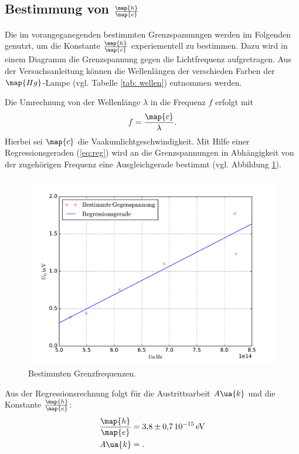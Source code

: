 \subsection{Bestimmung von $\frac{\map{h}}{\map{e}}$}

Die im vorangeganegenden bestimmten Grenzspanunngen werden im
Folgenden genutzt, um die Konstante $\frac{\map{h}}{\map{e}}$
experiementell zu bestimmen. Dazu wird in einem Diagramm die Grenzspannung
gegen die Lichtfrequenz aufgretragen.
Aus der Versuchsanleitung können die Wellenlängen der verschieden Farben der $\map{Hg}$-Lampe (vgl. Tabelle \ref{tab: wellen})
entnommen werden.

Die Umrechnung von der Wellenlänge $\lambda$ in die Frequenz $f$ erfolgt mit
\begin{equation*}
  \label{eq:umrech}
  f=\frac{\map{c}}{\lambda}.
\end{equation*}
Hierbei sei $\map{c}$ die Vaakumlichtgeschwindigkeit.
Mit Hilfe einer Regressionsgeraden (\eqref{eq:reg}) wird an die
Grenzspannungen in Abhängigkeit von der zugehörigen Frequenz
eine Ausgleichgerade bestimmt (vgl. Abbildung \ref{fig:grenz}).
\begin{figure}
    \centering
    \includegraphics[width=1 \textwidth]{../Messdaten/wellenlaenge_gegen.pdf}
    \caption{Bestimmten Grenzfrequenzen.}
    \label{fig:grenz}
  \end{figure}

Aus der Regressionsrechnung folgt für die Austrittsarbeit $A\ua{k}$ und die
Konstante $\frac{\map{h}}{\map{e}}$:
\begin{align}
  \label{eq:messergebnisse}
  \begin{aligned}
  \frac{\map{h}}{\map{e}}&= \num{3.8\pm 0.7}\,\num{e-15}\,\si{\eV} \\
  A\ua{k}&=.
  \end{aligned}
\end{align}

